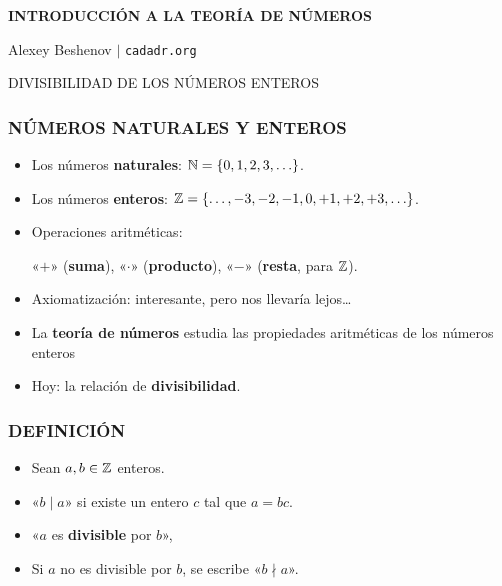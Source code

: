 



\begin{frame}
  \textbf{INTRODUCCIÓN A LA TEORÍA DE NÚMEROS}

  Alexey Beshenov $\mid$ \texttt{cadadr.org}

  \vfill

  \begin{center}\huge\headingfont
    DIVISIBILIDAD DE LOS NÚMEROS ENTEROS
  \end{center}

  \vfill
\end{frame}

\begin{frame}
  \frametitle{NÚMEROS NATURALES Y ENTEROS}

  \begin{itemize}
  \item<2-> Los números \textbf{naturales}:
    $\mathbb{N} = \{ 0, 1, 2, 3, \ldots \}$.

  \item<3-> Los números \textbf{enteros}:
    $\mathbb{Z} = \{ \ldots, -3, -2, -1, 0, +1, +2, +3, \ldots \}$.

  \item<4-> Operaciones aritméticas:

    «$+$» (\textbf{suma}),
    «$\cdot$» (\textbf{producto}),
    «$-$» (\textbf{resta}, para $\mathbb{Z}$).

  \item<5-> Axiomatización: interesante, pero nos llevaría lejos\dots

  \item<6-> La \textbf{teoría de números} estudia las propiedades aritméticas de
    los números enteros

  \item<8-> Hoy: la relación de \textbf{divisibilidad}.
  \end{itemize}
\end{frame}

\begin{frame}
  \frametitle{DEFINICIÓN}

  \begin{itemize}
  \item<2-> Sean $a, b \in \mathbb{Z}$ enteros.

  \item<3-> «$b \mid a$» si existe un entero $c$ tal que $a = bc$.

  \item<4-> «$a$ es \textbf{divisible} por $b$»,



  \item<7-> Si $a$ no es divisible por $b$, se escribe «$b\nmid a$».
  \end{itemize}
\end{frame}

